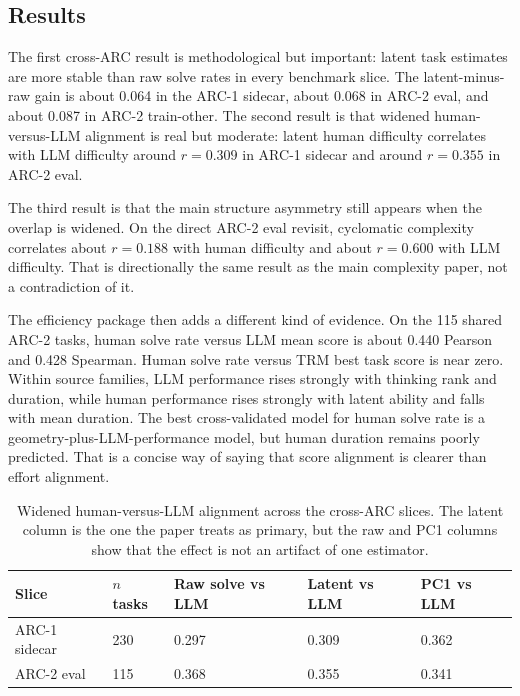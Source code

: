 \subsection{Results}

The first cross-ARC result is methodological but important: latent task estimates are more stable than raw solve rates in every benchmark slice. The latent-minus-raw gain is about 0.064 in the ARC-1 sidecar, about 0.068 in ARC-2 eval, and about 0.087 in ARC-2 train-other. The second result is that widened human-versus-LLM alignment is real but moderate: latent human difficulty correlates with LLM difficulty around $r = 0.309$ in ARC-1 sidecar and around $r = 0.355$ in ARC-2 eval.

The third result is that the main structure asymmetry still appears when the overlap is widened. On the direct ARC-2 eval revisit, cyclomatic complexity correlates about $r = 0.188$ with human difficulty and about $r = 0.600$ with LLM difficulty. That is directionally the same result as the main complexity paper, not a contradiction of it.

The efficiency package then adds a different kind of evidence. On the 115 shared ARC-2 tasks, human solve rate versus LLM mean score is about 0.440 Pearson and 0.428 Spearman. Human solve rate versus TRM best task score is near zero. Within source families, LLM performance rises strongly with thinking rank and duration, while human performance rises strongly with latent ability and falls with mean duration. The best cross-validated model for human solve rate is a geometry-plus-LLM-performance model, but human duration remains poorly predicted. That is a concise way of saying that score alignment is clearer than effort alignment.

\begin{table}[H]
\centering
\small
\caption{Widened human-versus-LLM alignment across the cross-ARC slices. The latent column is the one the paper treats as primary, but the raw and PC1 columns show that the effect is not an artifact of one estimator.}
\begin{tabular}{p{1.2in}p{0.8in}p{1.0in}p{1.0in}p{1.0in}}
\toprule
\textbf{Slice} & \textbf{$n$ tasks} & \textbf{Raw solve vs LLM} & \textbf{Latent vs LLM} & \textbf{PC1 vs LLM} \\
\midrule
ARC-1 sidecar & 230 & 0.297 & 0.309 & 0.362 \\
ARC-2 eval & 115 & 0.368 & 0.355 & 0.341 \\
\bottomrule
\end{tabular}
\end{table}

